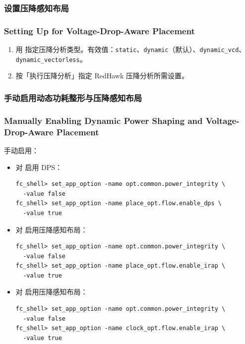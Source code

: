 \subsubsection{设置压降感知布局}
\subsubsection*{Setting Up for Voltage-Drop-Aware Placement}

\begin{enumerate}
  \item 用  指定压降分析类型。有效值：\texttt{static}、\texttt{dynamic}（默认）、\texttt{dynamic\_vcd}、\texttt{dynamic\_vectorless}。
  \item 按「执行压降分析」指定 RedHawk 压降分析所需设置。
\end{enumerate}

\subsubsection{手动启用动态功耗整形与压降感知布局}
\subsubsection*{Manually Enabling Dynamic Power Shaping and Voltage-Drop-Aware Placement}

手动启用：
\begin{itemize}
  \item 对  启用 DPS：
\begin{lstlisting}
fc_shell> set_app_option -name opt.common.power_integrity \
  -value false
fc_shell> set_app_option -name place_opt.flow.enable_dps \
  -value true
\end{lstlisting}
  \item 对  启用压降感知布局：
\begin{lstlisting}
fc_shell> set_app_option -name opt.common.power_integrity \
  -value false
fc_shell> set_app_option -name place_opt.flow.enable_irap \
  -value true
\end{lstlisting}
  \item 对  启用压降感知布局：
\begin{lstlisting}
fc_shell> set_app_option -name opt.common.power_integrity \
  -value false
fc_shell> set_app_option -name clock_opt.flow.enable_irap \
  -value true
\end{lstlisting}
\end{itemize}

